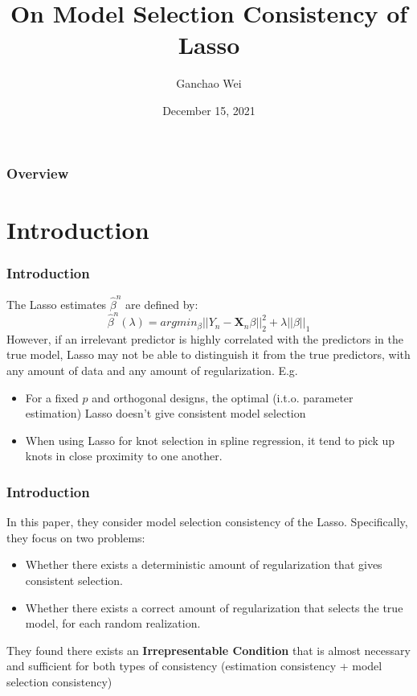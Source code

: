 \documentclass{beamer}
\title[MSC-LASSO]{On Model Selection Consistency of Lasso}
\author{Ganchao Wei}
\date{December 15, 2021}
\begin{document}
	
	\begin{frame}
		\titlepage %
	\end{frame}
	
	\begin{frame}
		\frametitle{Overview} %
		\tableofcontents
	\end{frame}
	
	
	\section{Introduction}
	
	\begin{frame}
		\frametitle{Introduction}
		The Lasso estimates $\hat{\beta}^n$ are defined by:
		$$\hat{\beta}^n(\lambda) = argmin_{\beta}||Y_n - \bm{X}_n\beta||_2^2 + \lambda||\beta||_1$$
		However, if an irrelevant predictor is highly correlated with the predictors in the true model, Lasso may not be able to distinguish it from the true predictors, with any amount of data and any amount of regularization. E.g.
		\begin{itemize}
			\item 
			For a fixed $p$ and orthogonal designs, the optimal (i.t.o. parameter estimation) Lasso doesn't give consistent model selection
			\item
			When using Lasso for knot selection in spline regression, it tend to pick up knots in close proximity to one another.
		\end{itemize}
	\end{frame}
	
	
	\begin{frame}
		\frametitle{Introduction}
		In this paper, they consider model selection consistency of the Lasso. Specifically, they focus on two problems:
		\begin{itemize}
			\item 
			Whether there exists a deterministic amount of regularization that gives consistent selection.
			\item
			Whether there exists a correct amount of regularization that selects the true model, for each random realization.
		\end{itemize}
		\vspace{\baselineskip}
		They found there exists an \textbf{Irrepresentable Condition} that is almost necessary and sufficient for both types of consistency (estimation consistency + model selection consistency)
	\end{frame}
	
\end{document}
